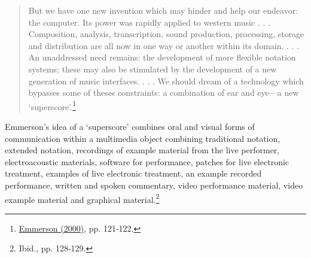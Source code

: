 \begin{quote}
But we have one new invention which may hinder and help our endeavor: the computer. Its power was rapidly applied to western music . . . Composition, analysis, transcription, sound production, processing, storage and distribution are all now in one way or another within its domain. . . . An unaddressed need remains: the development of more flexible notation systems; these may also be stimulated by the development of a new generation of music interfaces. . . . We should dream of a technology which bypasses some of theses constraints: a combination of ear and eye---a new `superscore'.\footnote{\hyperlink{emmersoncross}{Emmerson (2000)}, pp. 121-122.} 
\end{quote}
Emmerson's idea of a `superscore' combines oral and visual forms of communication within a multimedia object combining traditional notation, extended notation, recordings of example material from the live performer, electroacoustic materials, software for performance, patches for live electronic treatment, examples of live electronic treatment, an example recorded performance, written and spoken commentary, video performance material, video example material and graphical material.\footnote{Ibid., pp. 128-129.} 


